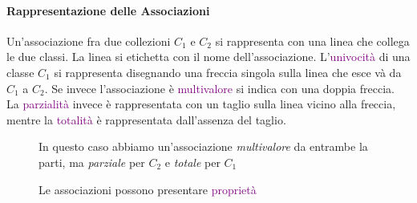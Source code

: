 \newpage
\paragraph{Rappresentazione delle Associazioni} Un'associazione fra due collezioni $C_1$ e $C_2$ si rappresenta
con una linea che collega le due classi. La linea si etichetta con il nome dell'associazione. L'\textcolor{purple}{univocità}
di una classe $C_1$ si rappresenta disegnando una freccia singola sulla linea che esce và da $C_1$ a $C_2$. Se invece l'associazione è
\textcolor{purple}{multivalore} si indica con una doppia freccia.
La \textcolor{purple}{parzialità} invece è rappresentata con un taglio sulla linea vicino alla freccia, mentre la
\textcolor{purple}{totalità} è rappresentata dall'assenza del taglio.

\begin{figure}[h]
    \centering
    \captionsetup{justification=centering}
    \caption{In questo caso abbiamo un'associazione \emph{multivalore} da entrambe la parti, ma \emph{parziale} per $C_2$ e \emph{totale} per $C_1$}
\end{figure}

\begin{figure}[h]
    \centering
    \captionsetup{justification=centering}
    \caption{Le associazioni possono presentare \textcolor{purple}{proprietà}}
\end{figure}

